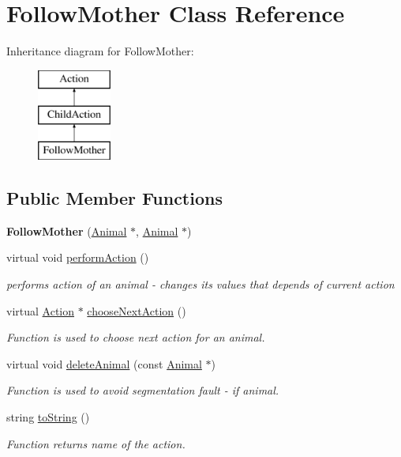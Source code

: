 \hypertarget{class_follow_mother}{}\section{Follow\+Mother Class Reference}
\label{class_follow_mother}
Inheritance diagram for Follow\+Mother\+:\begin{figure}[H]
\begin{center}
\leavevmode
\includegraphics[height=3.000000cm]{class_follow_mother}
\end{center}
\end{figure}
\subsection*{Public Member Functions}
\begin{DoxyCompactItemize}
\item 
\hypertarget{class_follow_mother_a0399072d549eafc52c0a738fe79a7b3e}{}{\bfseries Follow\+Mother} (\hyperlink{class_animal}{Animal} $\ast$, \hyperlink{class_animal}{Animal} $\ast$)\label{class_follow_mother_a0399072d549eafc52c0a738fe79a7b3e}

\item 
virtual void \hyperlink{class_follow_mother_ace13e303253ad224eb4ddb1f1f0c800d}{perform\+Action} ()
\begin{DoxyCompactList}\small\item\em performs action of an animal -\/ changes it\textquotesingle{}s values that depends of current action \end{DoxyCompactList}\item 
virtual \hyperlink{class_action}{Action} $\ast$ \hyperlink{class_follow_mother_aef94bc17f41a2873b6d2843054882617}{choose\+Next\+Action} ()
\begin{DoxyCompactList}\small\item\em Function is used to choose next action for an animal. \end{DoxyCompactList}\item 
virtual void \hyperlink{class_follow_mother_a0edf307dfd83b18c3817667f2d2af670}{delete\+Animal} (const \hyperlink{class_animal}{Animal} $\ast$)
\begin{DoxyCompactList}\small\item\em Function is used to avoid segmentation fault -\/ if animal. \end{DoxyCompactList}\item 
string \hyperlink{class_follow_mother_a90e915d9987b55223b7c0b8ebf99b4da}{to\+String} ()
\begin{DoxyCompactList}\small\item\em Function returns name of the action. \end{DoxyCompactList}\end{DoxyCompactItemize}
